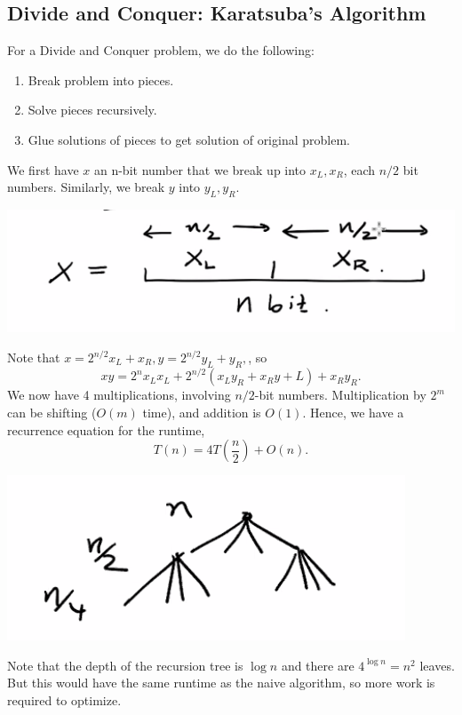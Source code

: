 \documentclass[11pt]{scrartcl}
\begin{document}
\subsection{Divide and Conquer: Karatsuba's Algorithm}
For a Divide and Conquer problem, we do the following:
\begin{enumerate}
\item  Break problem into pieces.
\item Solve pieces recursively.
\item Glue solutions of pieces to get solution of original problem.
\end{enumerate}
We first have $x$ an n-bit number that we break up into $x_L, x_R$, each $n/2$ bit numbers.  Similarly, we break $y$ into $y_L, y_R$.
\begin{center}
\includegraphics[scale=0.5]{dac.png}
\end{center}
Note that $x = 2^{n/2}x_L + x_R, y = 2^{n/2}y_L + y_R,$, so
$$xy = 2^n x_Lx_L + 2^{n/2}(x_Ly_R + x_Ry+L) + x_Ry_R.$$
We now have 4 multiplications, involving $n/2$-bit numbers.  Multiplication by $2^m$ can be shifting ($O(m)$ time), and addition is $O(1)$.  Hence, we have a recurrence equation for the runtime,
$$T(n) = 4T\left (\frac{n}{2}\right ) + O(n).$$
\begin{center}
\includegraphics[scale=0.5]{rec.png}
\end{center}
Note that the depth of the recursion tree is $\log n$ and there are $4^{\log n} = n^2$ leaves.  But this would have the same runtime as the naive algorithm, so more work is required to optimize.
\end{document}
